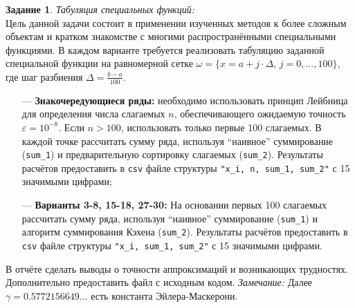 \documentclass{article}
\theoremstyle{definition}
\newtheorem{task}{Задание}
\begin{document}
\begin{task}
\textit{Табуляция специальных функций:} \\
Цель данной задачи состоит в применении изученных методов к более сложным объектам и кратком знакомстве с многими распространёнными специальными функциями. В каждом варианте требуется реализовать табуляцию заданной специальной функции на равномерной сетке $\omega = \{x=a+j\cdot\Delta,\, j=0,...,100\}$, где шаг разбиения $\Delta = \frac{b-a}{100}$.
\begin{itemize}
\item[---] \textbf{Знакочередующиеся ряды:} необходимо использовать принцип Лейбница для определения числа  слагаемых $n$, обеспечивающего ожидаемую точность $\varepsilon=10^{-8}$. Если $n>100$, использовать только первые 100 слагаемых. В каждой точке рассчитать сумму ряда, используя ``наивное'' суммирование (\verb|sum_1|) и предварительную сортировку слагаемых (\verb|sum_2|). Результаты расчётов предоставить в \verb_csv_ файле структуры \verb|"x_i, n, sum_1, sum_2"| с 15 значимыми цифрами;
\item[---] \textbf{Варианты 3-8, 15-18, 27-30:} На основании первых 100 слагаемых рассчитать сумму ряда, используя ``наивное'' суммирование (\verb|sum_1|) и алгоритм суммирования Кэхена (\verb|sum_2|).  Результаты расчётов предоставить в \verb_csv_ файле структуры \verb|"x_i, sum_1, sum_2"| с 15 значимыми цифрами.
\end{itemize}
В отчёте сделать выводы о точности аппроксимаций и возникающих трудностях. Дополнительно предоставить файл с исходным кодом. \textit{Замечание:} Далее $\gamma=0.5772156649...$ есть константа Эйлера-Маскерони.
\end{task}
\renewcommand*{\arraystretch}{1.5}
\end{document}
